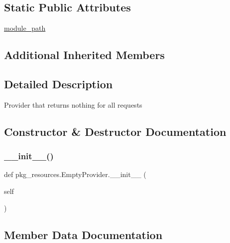 \subsection*{Static Public Attributes}
\begin{DoxyCompactItemize}
\item 
\hyperlink{classpkg__resources_1_1EmptyProvider_ab8ccb1251fac53b8648ceb34c8449d67}{module\+\_\+path}
\end{DoxyCompactItemize}
\subsection*{Additional Inherited Members}


\subsection{Detailed Description}
\begin{DoxyVerb}Provider that returns nothing for all requests\end{DoxyVerb}
 

\subsection{Constructor \& Destructor Documentation}
\mbox{\label{classpkg__resources_1_1EmptyProvider_a20ef7e9649edf4800dc02dbd50b5d410}} 
\subsubsection{\texorpdfstring{\+\_\+\+\_\+init\+\_\+\+\_\+()}{\_\_init\_\_()}}
{\footnotesize\ttfamily def pkg\+\_\+resources.\+Empty\+Provider.\+\_\+\+\_\+init\+\_\+\+\_\+ (\begin{DoxyParamCaption}\item[{}]{self }\end{DoxyParamCaption})}



\subsection{Member Data Documentation}
\mbox{\label{classpkg__resources_1_1EmptyProvider_ab8ccb1251fac53b8648ceb34c8449d67}} 
